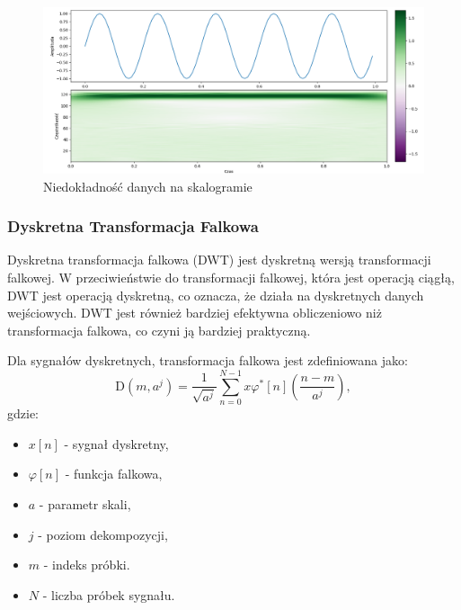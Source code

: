 \begin{figure}[ht]
    \centering
    \begin{minipage}[t]{0.57\linewidth}
        \includegraphics[width=\linewidth]{Rozdziały/02.Podstawy_teoretyczne/Obrazy/skalogram_sinus.png}
        \caption{Niedokładność danych na skalogramie}
        \label{fig:image40}
    \end{minipage}
\end{figure}

\newpage
\subsubsection{Dyskretna Transformacja Falkowa}

Dyskretna transformacja falkowa (DWT) jest dyskretną wersją transformacji falkowej. W przeciwieństwie do transformacji falkowej, która jest operacją ciągłą, DWT jest operacją dyskretną, co oznacza, że działa na dyskretnych danych wejściowych. DWT jest również bardziej efektywna obliczeniowo niż transformacja falkowa, co czyni ją bardziej praktyczną.

Dla sygnałów dyskretnych, transformacja falkowa jest zdefiniowana jako:
\begin{equation*}
    \mathrm{D}\left(m, a^j\right)=\frac{1}{\sqrt{a^j}} \sum_{n=0}^{N-1} x\varphi^*[n] \left(\frac{n-m}{a^j}\right),
\end{equation*}
gdzie:
\begin{itemize}
    \item $x[n]$ - sygnał dyskretny,
    \item $\varphi[n]$ - funkcja falkowa,
    \item $a$ - parametr skali,
    \item $j$ - poziom dekompozycji,
    \item $m$ - indeks próbki.
    \item $N$ - liczba próbek sygnału.
\end{itemize}

